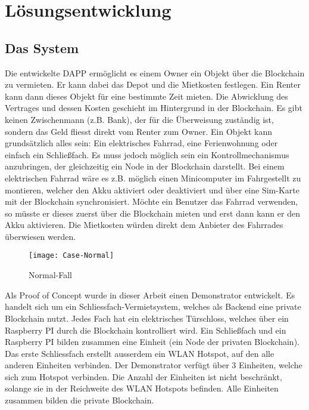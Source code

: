 \chapter{Lösungsentwicklung}
\label{cha:Lösungsentwicklung}

\section{Das System}
\label{cha:Das System}

Die entwickelte DAPP ermöglicht es einem Owner ein Objekt über die Blockchain zu vermieten. Er kann dabei das Depot und die Mietkosten festlegen. Ein Renter kann dann dieses Objekt für eine bestimmte Zeit mieten. Die Abwicklung des Vertrages und dessen Kosten geschieht im Hintergrund in der Blockchain. Es gibt keinen Zwischenmann (z.B. Bank), der für die Überweisung zuständig ist, sondern das Geld fliesst direkt vom Renter zum Owner. 
Ein Objekt kann grundsätzlich alles sein: Ein elektrisches Fahrrad, eine Ferienwohnung oder einfach ein Schließfach. Es muss jedoch möglich sein ein Kontrollmechanismus anzubringen, der gleichzeitig ein Node in der Blockchain darstellt. Bei einem elektrischen Fahrrad wäre es z.B. möglich einen Minicomputer im Fahrgestellt zu montieren, welcher den Akku aktiviert oder deaktiviert und über eine Sim-Karte mit der Blockchain synchronisiert. Möchte ein Benutzer das Fahrrad verwenden, so müsste er dieses zuerst über die Blockchain mieten und erst dann kann er den Akku aktivieren. Die Mietkosten würden direkt dem Anbieter des Fahrrades überwiesen werden.

\begin{figure}
\centering
\texttt{[image: Case-Normal]}
\caption{Normal-Fall}
\label{fig:Case-Normal}
\end{figure}

\vspace{1em}
Als Proof of Concept wurde in dieser Arbeit einen Demonstrator entwickelt. Es handelt sich um ein Schliessfach-Vermietsystem, welches als Backend eine private Blockchain nutzt. Jedes Fach hat ein elektrisches Türschloss, welches über ein Raspberry PI durch die Blockchain kontrolliert wird. Ein Schließfach und ein Raspberry PI bilden zusammen eine Einheit (ein Node der privaten Blockchain). Das erste Schliessfach erstellt ausserdem ein WLAN Hotspot, auf den alle anderen Einheiten verbinden. Der Demonstrator verfügt über 3 Einheiten, welche sich zum Hotspot verbinden. Die Anzahl der Einheiten ist nicht beschränkt, solange sie in der Reichweite des WLAN Hotspots befinden. Alle Einheiten zusammen bilden die private Blockchain. 

